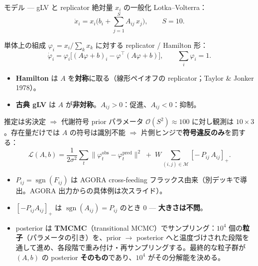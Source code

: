 \documentclass[
  ignorenonframetext,
  aspectratio=169,
]{beamer}
\providecommand{\tightlist}{%
  \setlength{\itemsep}{0pt}\setlength{\parskip}{0pt}}
\begin{document}
\begin{frame}{モデル --- gLV と replicator}
\protect\hypertarget{ux30e2ux30c7ux30eb-glv-ux3068-replicator}{}
絶対量 \(x_i\) の一般化 Lotka--Volterra：
\[\dot{x}_i = x_i\Big(b_i + \sum_{j=1}^{S} A_{ij}\,x_j\Big),\qquad S=10 .\]

単体上の組成 \(\varphi_i=x_i/\sum_k x_k\) に対する replicator / Hamilton
形：
\[\dot{\varphi}_i = \varphi_i\Big[(A\varphi+b)_i - \varphi^{\!\top}(A\varphi+b)\Big],
\qquad \sum_i\varphi_i=1 .\]

\begin{itemize}
\tightlist
\item
  \textbf{Hamilton} は \(A\) を\textbf{対称}に取る（線形ペイオフの
  replicator；Taylor \& Jonker 1978）。
\item
  \textbf{古典 gLV} は \(A\)
  が\textbf{非対称}。\(A_{ij}>0\)：促進、\(A_{ij}<0\)：抑制。
\end{itemize}
\end{frame}

\begin{frame}{推定は劣決定 \(\Rightarrow\) 代謝符号 prior}
\protect\hypertarget{ux63a8ux5b9aux306fux52a3ux6c7aux5b9a-rightarrow-ux4ee3ux8b1dux7b26ux53f7-prior}{}
パラメータ \(\mathcal{O}(S^2)\approx100\) に対し観測は
\(10\times3\)。存在量だけでは \(A\) の符号は識別不能 \(\Rightarrow\)
片側ヒンジで\textbf{符号違反のみ}を罰する：
\[\mathcal{L}(A,b)=\frac{1}{2\sigma^{2}}\sum_{t}\big\lVert\varphi^{\text{obs}}_{t}-\varphi^{\text{pred}}_{t}\big\rVert^{2}
\;+\; W\!\!\sum_{(i,j)\in\mathcal{M}}\!\!\left[-\,P_{ij}\,A_{ij}\right]_{+} .\]

\begin{itemize}
\tightlist
\item
  \(P_{ij}=\operatorname{sgn}(F_{ij})\) は AGORA cross-feeding
  フラックス由来（別デッキで導出。AGORA 出力からの具体例は次スライド）。
\item
  \(\left[-P_{ij}A_{ij}\right]_{+}\) は
  \(\operatorname{sgn}(A_{ij})=P_{ij}\) のとき \(0\) ---
  \textbf{大きさは不問}。
\item
  posterior は \textbf{TMCMC}（transitional
  MCMC）でサンプリング：\(10^{4}\)
  個の\textbf{粒子}（パラメータの引き）を、prior \(\to\) posterior
  へと温度づけされた段階を通して進め、各段階で重み付け・再サンプリングする。最終的な粒子群が
  \((A,b)\) の posterior \textbf{そのもの}であり、\(10^{4}\)
  がその分解能を決める。
\end{itemize}
\end{frame}
\end{document}
